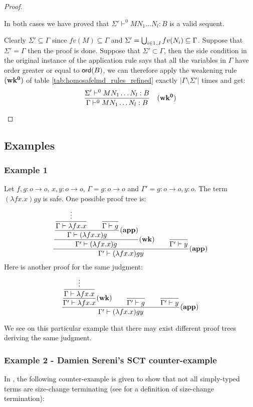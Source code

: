 \begin{proof}
\begin{itemize}
In both cases we have proved that $\Sigma'  \vdash^{0} M N_1 \ldots N_l : B$ is a valid sequent.

Clearly $\Sigma' \subseteq \Gamma$ since $fv(M) \subseteq \Gamma$ and $\Sigma' = \bigcup_{i\in1..l} fv(N_i) \subseteq \Gamma$.
Suppose that $\Sigma' = \Gamma$ then the proof is done.
Suppose that $\Sigma' \subset \Gamma$, then the side condition in the original instance of the application rule says that all
the variables in $\Gamma$ have order
greater or equal to ${\sf ord}(B)$, we can therefore apply the weakening rule $\mathbf{(wk^0)}$
of table \ref{tab:homosafelmd_rules_refined} exactly $|\Gamma\setminus \Sigma'|$ times and get:
$$ \frac{\displaystyle \Sigma'  \vdash^{0} M N_1 \ldots N_l : B}{\Gamma  \vdash^{0} M N_1 \ldots N_l : B} \quad \mathbf{(wk^0)}
$$


\end{itemize}
\end{proof}


\subsection{Examples}
\subsubsection{Example 1}
Let $f,g:o\rightarrow o$, $x,y:o\rightarrow o$, $\Gamma =
g:o\rightarrow o$ and $\Gamma' = g:o\rightarrow o, y:o$. The term
$(\lambda f x . x) g y $ is safe. One possible proof tree is:
$$ \frac{\displaystyle 
        \frac{\displaystyle 
            \frac{\displaystyle 
                \frac{\displaystyle \vdots}{\Gamma \vdash \lambda f x. x}      \qquad \frac{\displaystyle}{\Gamma \vdash g} }{\Gamma \vdash (\lambda f x. x) g} \mathbf{(app)}
        }{ \Gamma' \vdash (\lambda f x. x) g } \mathbf{(wk)}
        \qquad \frac{\displaystyle}{\Gamma' \vdash y}
    }{ \Gamma' \vdash (\lambda f x. x) g y } \mathbf{(app)}
$$
Here is another proof for the same judgment:
$$ \frac{\displaystyle   \frac{\displaystyle  \frac{\displaystyle \vdots}{\Gamma \vdash \lambda f x. x} }{\Gamma' \vdash \lambda f x. x} \mathbf{(wk)}    \qquad \frac{\displaystyle }{\Gamma' \vdash g} \qquad \frac{\displaystyle }{\Gamma' \vdash y}}{\Gamma' \vdash (\lambda f x. x) g y } \mathbf{(app)}$$

We see on this particular example that there may exist different
proof trees deriving the same judgment.

\subsubsection{Example 2 - Damien Sereni's SCT counter-example}
In \cite{serenistypesct05}, the following counter-example is given
to show that not all simply-typed terms are size-change terminating
(see \cite{jones01} for a definition of size-change termination):

